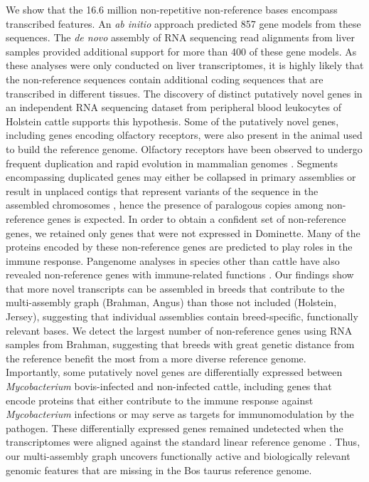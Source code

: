 \documentclass[../main.tex]{subfiles}
\begin{document}
We show that the 16.6 million non-repetitive non-reference bases encompass transcribed features. An \emph{ab initio} approach predicted 857 gene models from these sequences. The \emph{de novo} assembly of RNA sequencing read alignments from liver samples provided additional support for more than 400 of these gene models. As these analyses were only conducted on liver transcriptomes, it is highly likely that the non-reference sequences contain additional coding sequences that are transcribed in different tissues. The discovery of distinct putatively novel genes in an independent RNA sequencing dataset from peripheral blood leukocytes of Holstein cattle supports this hypothesis. Some of the putatively novel genes, including genes encoding olfactory receptors, were also present in the animal used to build the reference genome. Olfactory receptors have been observed to undergo frequent duplication and rapid evolution in mammalian genomes \citep{li2017comprehensive,hughes2018birth}. Segments encompassing duplicated genes may either be collapsed in primary assemblies or result in unplaced contigs that represent variants of the sequence in the assembled chromosomes \citep{vollger2019long,kelley2010detection}, hence the presence of paralogous copies among non-reference genes is expected. In order to obtain a confident set of non-reference genes, we retained only genes that were not expressed in Dominette. Many of the proteins encoded by these non-reference genes are predicted to play roles in the immune response. Pangenome analyses in species other than cattle have also revealed non-reference genes with immune-related functions \citep{li2017comprehensive,gordon2017extensive,golicz2020pangenomics}. Our findings show that more novel transcripts can be assembled in breeds that contribute to the multi-assembly graph (Brahman, Angus) than those not included (Holstein, Jersey), suggesting that individual assemblies contain breed-specific, functionally relevant bases. We detect the largest number of non-reference genes using RNA samples from Brahman, suggesting that breeds with great genetic distance from the reference benefit the most from a more diverse reference genome. Importantly, some putatively novel genes are differentially expressed between\emph{ Mycobacterium} bovis-infected and non-infected cattle, including genes that encode proteins that either contribute to the immune response against \emph{Mycobacterium} infections or may serve as targets for immunomodulation by the pathogen. These differentially expressed genes remained undetected when the transcriptomes were aligned against the standard linear reference genome \citep{mcloughlin2014rna}. Thus, our multi-assembly graph uncovers functionally active and biologically relevant genomic features that are missing in the Bos taurus reference genome.
\end{document}
